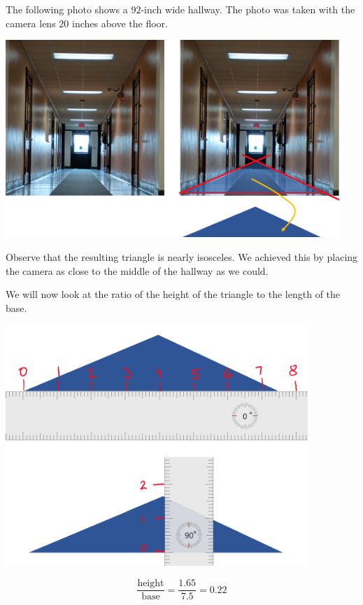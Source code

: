 \documentclass{ximera}
\begin{document}
\begin{exploration}\label{exp:hallway}

The following photo shows a $92$-inch wide hallway.  The photo was taken with the camera lens $20$ inches above the floor.

\begin{image}
         \includegraphics[width=5in]{hallwayExp.jpg}
\end{image}


Observe that the resulting triangle is nearly isosceles.  We achieved this by placing the camera as close to the middle of the hallway as we could.  

We will now look at the ratio of the height of the triangle to the length of the base.

\begin{image}
         \includegraphics[width=4.5in]{triangleMeasures1.jpg}
\end{image}

$$\frac{\text{height}}{\text{base}}=\frac{1.65}{7.5}=0.22$$


\end{exploration}
\end{document}
